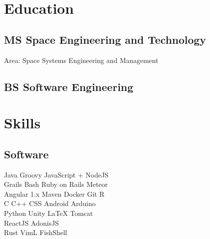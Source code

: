 \documentclass[]{deedy-resume-openfont}
\begin{document}
\begin{minipage}[t]{0.33\textwidth}


\section{Education}

\subsection{MS Space Engineering \newline and Technology}
Area: Space Systems Engineering and Management
\sectionsep

\subsection{BS Software \newline Engineering}


\section{Skills}
\subsection{Software}
Java \textbullet{} Groovy \textbullet{} JavaScript + NodeJS \textbullet{} \\
Grails \textbullet{} Bash \textbullet{} Ruby on Rails \textbullet{} Meteor \textbullet{} \\
Angular 1.x \textbullet{} Maven \textbullet{} Docker \textbullet{} Git \textbullet{} R \\
C \textbullet{} C++ \textbullet{} CSS \textbullet{} Android \textbullet{} Arduino \\
Python \textbullet{} Unity \textbullet{} \LaTeX \textbullet{} Tomcat \\
ReactJS \textbullet{} AdonisJS \\
Rust \textbullet{} VimL \textbullet{} FishShell
\sectionsep


\end{minipage}
\end{document}

